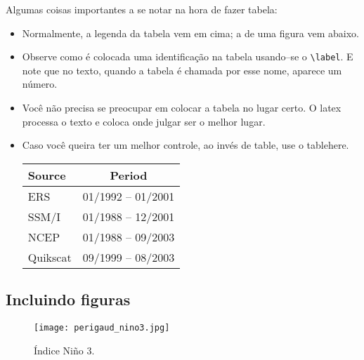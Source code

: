 \documentclass[pdftex,12pt,a4paper]{article} %
\makeatletter
\newenvironment{tablehere}
  {\def\@captype{table}} {}
\makeatother
\begin{document}
Algumas coisas importantes a se notar na hora de fazer tabela:
\begin{itemize}
\item Normalmente, a legenda da tabela vem em cima; a de uma figura vem abaixo.
  \item Observe como é colocada uma identificação na tabela usando--se
    o \verb#\label#. E note que no texto, quando a tabela é chamada por esse
    nome, aparece um número.
\item Você não precisa se preocupar em colocar a tabela no lugar
  certo. O latex processa o texto e coloca onde julgar ser o melhor
  lugar.
\item Caso você queira ter um melhor controle, ao invés de table, use
  o tablehere.
\begin{tablehere}
\begin{center}
\caption{Wind data period range.}
\begin{tabular}{|l|c|} \hline \hline
 Source &  Period \\ \hline
ERS & 01/1992 -- 01/2001 \\
SSM/I & 01/1988 -- 12/2001 \\
NCEP & 01/1988 -- 09/2003 \\
Quikscat & 09/1999 -- 08/2003 \\ \hline \hline
\end{tabular}
\end{center}
\label{period_range}
\end{tablehere}
\end{itemize}

\subsection{Incluindo figuras}

\begin{figure}
\vspace{.5cm}
\centerline{\hbox{\texttt{[image: perigaud\_nino3.jpg]}}}
\vspace{-.5cm}
\caption{\small Índice Niño 3.}
\label{elnino}
\end{figure}
\end{document}
